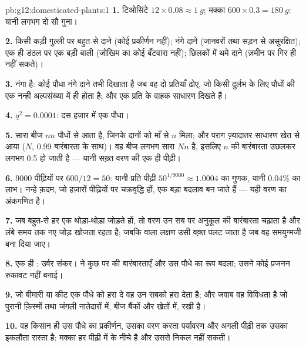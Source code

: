 \begin{solution}{pb:g12:domesticated-plants:1}
\textbf{1.} टिओसिंटे $12 \times 0.08 \approx \qty{1}{g}$; मक्का $600
\times 0.3 = \qty{180}{g}$: यानी लगभग दो सौ गुना।

\textbf{2.} किसी कड़ी गुल्ली पर बहुत-से दाने (कोई प्रकीर्णन नहीं); नंगे दाने
(जानवरों तथा सड़न से असुरक्षित); एक ही डंठल पर एक बड़ी बाली (जोखिम का कोई
बँटवारा नहीं); छिलकों में थमे दाने (ज़मीन पर गिर ही नहीं सकते)।

\textbf{3.} नंगा   है: कोई पौधा नंगे दाने तभी दिखाता है
जब वह दो प्रतियाँ ढोए, जो किसी दुर्लभ  के लिए पौधों की एक नन्ही
अल्पसंख्या में ही होता है; और एक प्रति के वाहक साधारण दिखते हैं।

\textbf{4.} $q^2 = 0.0001$: दस हज़ार में एक पौधा।

\textbf{5.} सारा बीज $nn$ पौधों से आता है, जिनके दानों को माँ से $n$ मिला;
और पराग ज़्यादातर साधारण खेत से आया ($N$, 0.99 बारंबारता के साथ)। वह बीज
लगभग सारा $Nn$ है, इसलिए $n$ की बारंबारता उछलकर लगभग 0.5 हो जाती है --- यानी
सख़्त वरण की एक ही पीढ़ी।

\textbf{6.} 9000 पीढ़ियों पर $600/12 = 50$: यानी प्रति पीढ़ी $50^{1/9000}
\approx 1.0004$ का गुणक, यानी 0.04\% का लाभ। नन्हे क़दम, जो हज़ारों
पीढ़ियों पर चक्रवृद्धि हों, एक बड़ा बदलाव बन जाते हैं --- यही वरण का
अंकगणित है।

\textbf{7.} जब बहुत-से  हर एक थोड़ा-थोड़ा जोड़ते हों, तो वरण उन सब पर
अनुकूल  की बारंबारता चढ़ाता है और लंबे समय तक नए जोड़ खोजता
रहता है; जबकि  वाला लक्षण उसी वक़्त पलट जाता है जब वह 
 समयुग्मजी बना दिया जाए।

\textbf{8.} एक ही : उर्वर संकर।  ने कुछ  पर 
की बारंबारताएँ और उस पौधे का रूप बदला; उसने कोई प्रजनन रुकावट नहीं बनाई।

\textbf{9.} जो बीमारी या कीट एक पौधे को हरा दे वह उन सबको हरा देता है; और
जवाब वह विविधता है जो पुरानी क़िस्मों तथा जंगली नातेदारों में, बीज बैंकों
और खेतों में, रखी है।

\textbf{10.} वह किसान ही उस पौधे का प्रकीर्णन, उसका वरण करता पर्यावरण और
अगली पीढ़ी तक उसका इकलौता रास्ता है: मक्का हर पीढ़ी में  के नीचे
है और उससे निकल नहीं सकती।


\end{solution}

